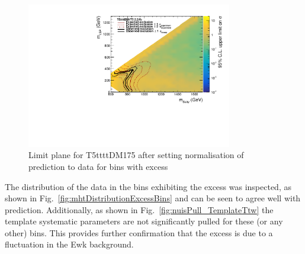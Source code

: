 \begin{figure}[tbhp]
  \caption{Limit plane for T5ttttDM175 after setting normalisation of prediction to data for bins with excess \label{fig:removeExcessByHand_T5ttttDM175}} 
  \begin{center}    
    \includegraphics[width=0.8\textwidth]{figures/susyResults/finalCanvasObsLimitXs_excessRemovedByHand_T5ttttDM175}
  \end{center}
\end{figure}

The \mht distribution of the data in the bins exhibiting the excess was inspected, 
as shown in Fig.~\ref{fig:mhtDistributionExcessBins} and can be seen to agree well
with prediction. Additionally, as shown in Fig.~\ref{fig:nuisPull_TemplateTtw} the template
systematic parameters are not significantly pulled for these (or any other) bins.
This provides further confirmation that the excess is due to a fluctuation in 
the Ewk background.

